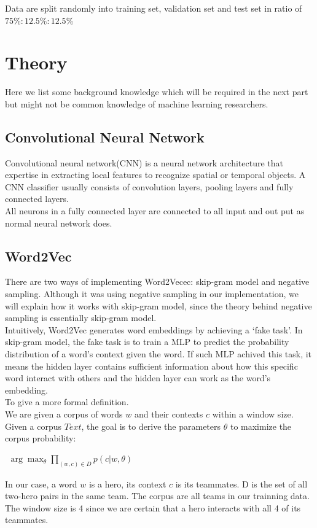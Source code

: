 \documentclass[12pt,openany,a4paper]{book}
\begin{document}
  Data are split randomly into training set, validation set and test set in ratio of $75\%:12.5\%:12.5\%$
  

\chapter{Theory}

Here we list some background knowledge which will be required in the next part but might not be common knowledge of machine learning researchers.

\section{Convolutional Neural Network}

 Convolutional neural network(CNN) is a neural network architecture that expertise in extracting local features to recognize spatial or temporal objects\cite{lecun1995convolutional}. A CNN classifier usually consists of convolution layers, pooling layers and fully connected layers.\\

All neurons in a fully connected layer are connected to all input and out put as normal neural network does.   

\section{Word2Vec}
There are two ways of implementing Word2Vecec\cite{mikolov2013efficient}: skip-gram model and negative sampling. Although it was using negative sampling in our implementation, we will explain how it works with skip-gram model, since the theory behind negative sampling is essentially skip-gram model.\\

Intuitively, Word2Vec generates word embeddings by achieving a `fake task'. In skip-gram model, the fake task is to train a MLP to predict the probability distribution of a word's context given the word. If such MLP achived this task, it means the hidden layer contains sufficient information about how this specific word interact with others and the hidden layer can work as the word's embedding.\\

To give a more formal definition. \\

We are given a corpus of words $w$ and their contexts $c$ within a window size. Given a corpus $Text$, the goal is to derive the parameters $\theta$ to maximize the corpus probability\cite{goldberg2014word2vec}:\\
\begin{center}
$\begin{aligned}
\arg\max_{\theta}\prod_{(w,c)\in D}p(c|w,\theta)
\end{aligned}$
\end{center}
In our case, a word $w$ is a hero, its context $c$ is its teammates. D is the set of all two-hero pairs in the same team. The corpus are all teams in our trainning data. The window size is 4 since we are certain that a hero interacts with all 4 of its teammates.
\end{document}
